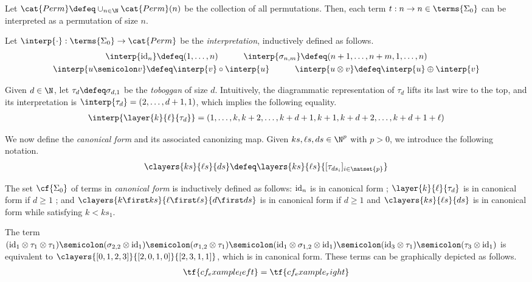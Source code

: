 Let $\cat{Perm}\defeq\cup_{n\in\N}\cat{Perm}(n)$ be the collection of all permutations. Then, each term $t:n\to n\in\terms{\Sigma_0}$ can be interpreted as a permutation of size $n$.

\begin{definition}[interpretation]
    Let $\interp{\cdot}:\terms{\Sigma_0}\to\cat{Perm}$ be the \emph{interpretation}, inductively defined as follows.
    \begin{gather*}
        \interp{\textup{id}_n}\defeq (1,\dots,n)\hspace{3em}
        \interp{\sigma_{n,m}}\defeq (n+1,\dots,n+m,1,\dots,n)\\
        \interp{u\semicolon v}\defeq\interp{v}\circ\interp{u} \hspace{3em}
        \interp{u\otimes v}\defeq\interp{u}\oplus\interp{v}
    \end{gather*}
\end{definition}

Given $d\in\N$, let $\tau_d \defeq \sigma_{d,1}$ be the \emph{toboggan} of size $d$. Intuitively, the diagrammatic representation of $\tau_d$ lifts its last wire to the top, and its interpretation is $\interp{\tau_d}=(2,\dots,d+1,1)$, which implies the following equality.
\begin{gather*}
    \interp{\layer{k}{\ell}{\tau_d}}=(1,\dots,k,k+2,\dots,k+d+1,k+1,k+d+2,\dots,k+d+1+\ell)
\end{gather*}

We now define the \emph{canonical form} and its associated canonizing map. Given $ks,\ell s,ds\in\N^p$ with $p>0$, we introduce the following notation.
\begin{gather*}
    \clayers{ks}{\ell s}{ds}\defeq \layers{ks}{\ell s}{[\tau_{ds_i}]_{i\in\natset{p}}}
\end{gather*}

\begin{definition}\label{def:cf}
    The set $\cf{\Sigma_0}$ of terms in \emph{canonical form} is inductively defined as follows: $\textup{id}_n$ is in canonical form ; $\layer{k}{\ell}{\tau_d}$ is in canonical form if $d\ge1$ ; and $\clayers{k\first ks}{\ell\first \ell s}{d\first ds}$ is in canonical form if $d\ge1$ and $\clayers{ks}{\ell s}{ds}$ is in canonical form while satisfying $k<ks_1$.
\end{definition}

\begin{example}\label{ex:examplecf}
    The term $(\textup{id}_1\otimes\tau_1\otimes\tau_1)\semicolon(\sigma_{2,2}\otimes\textup{id}_1)\semicolon(\sigma_{1,2}\otimes\tau_1)\semicolon(\textup{id}_1\otimes\sigma_{1,2}\otimes\textup{id}_1)\semicolon(\textup{id}_3\otimes\tau_1)\semicolon(\tau_3\otimes\textup{id}_1)$ is equivalent to $\clayers{[0,1,2,3]}{[2,0,1,0]}{[2,3,1,1]}$, which is in canonical form. These terms can be graphically depicted as follows.
    \begin{gather*}
        \tf{cf_example_left} = \tf{cf_example_right}
    \end{gather*}
\end{example}

